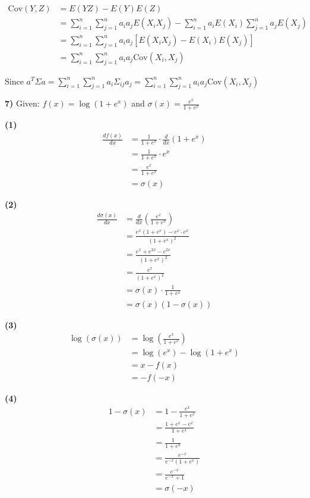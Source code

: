 \documentclass{article}
\begin{document}
\begin{align}
\text{Cov}(Y,Z) &= E(YZ) - E(Y)E(Z) \\
&= \sum_{i=1}^n \sum_{j=1}^n a_i a_j E(X_i X_j) - \sum_{i=1}^n a_i E(X_i) \sum_{j=1}^n a_j E(X_j) \\
&= \sum_{i=1}^n \sum_{j=1}^n a_i a_j [E(X_i X_j) - E(X_i)E(X_j)] \\
&= \sum_{i=1}^n \sum_{j=1}^n a_i a_j \text{Cov}(X_i, X_j)
\end{align}

Since $a^T \Sigma a = \sum_{i=1}^n \sum_{j=1}^n a_i \Sigma_{ij} a_j = \sum_{i=1}^n \sum_{j=1}^n a_i a_j \text{Cov}(X_i, X_j)$

\newpage

\textbf{7)} Given: $f(x) = \log(1 + e^x)$ and $\sigma(x) = \frac{e^x}{1 + e^x}$

\textbf{(1)} 
\begin{align}
\frac{d f(x)}{dx} &= \frac{1}{1 + e^x} \cdot \frac{d}{dx}(1 + e^x) \\
&= \frac{1}{1 + e^x} \cdot e^x \\
&= \frac{e^x}{1 + e^x} \\
&= \sigma(x)
\end{align}

\textbf{(2)} 
\begin{align}
\frac{d\sigma(x)}{dx} &= \frac{d}{dx}\left(\frac{e^x}{1 + e^x}\right) \\
&= \frac{e^x(1 + e^x) - e^x \cdot e^x}{(1 + e^x)^2} \\
&= \frac{e^x + e^{2x} - e^{2x}}{(1 + e^x)^2} \\
&= \frac{e^x}{(1 + e^x)^2} \\
&= \sigma(x) \cdot \frac{1}{1 + e^x} \\
&= \sigma(x)(1 - \sigma(x))
\end{align}

\textbf{(3)} 
\begin{align}
\log(\sigma(x)) &= \log\left(\frac{e^x}{1 + e^x}\right) \\
&= \log(e^x) - \log(1 + e^x) \\
&= x - f(x) \\
&= -f(-x)
\end{align}

\textbf{(4)} 
\begin{align}
1 - \sigma(x) &= 1 - \frac{e^x}{1 + e^x} \\
&= \frac{1 + e^x - e^x}{1 + e^x} \\
&= \frac{1}{1 + e^x} \\
&= \frac{e^{-x}}{e^{-x}(1 + e^x)} \\
&= \frac{e^{-x}}{e^{-x} + 1} \\
&= \sigma(-x)
\end{align}
\end{document}
